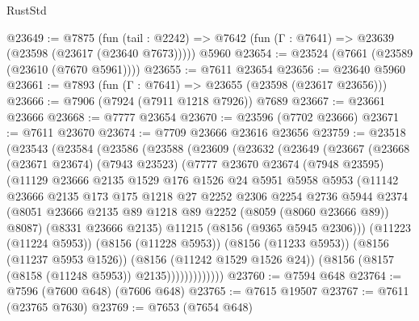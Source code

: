\begin{lexlean}{RustStd}
\begin{coremodule}
{\begin{coremodule}
{{{{{{{{{{{{{{{{{{{{{{{{{{{{{{{{{{@23649 := @7875
    (fun (tail : @2242) => @7642 (fun (Γ : @7641) => @23639 (@23598 (@23617 (@23640 @7673)))))
    @5960
@23654 := @23524 (@7661 (@23589 (@23610 (@7670 @5961))))
@23655 := @7611 @23654
@23656 := @23640 @5960
@23661 := @7893 (fun (Γ : @7641) => @23655 (@23598 (@23617 @23656)))
@23666 := @7906 (@7924 (@7911 @1218 @7926)) @7689
@23667 := @23661 @23666
@23668 := @7777 @23654
@23670 := @23596 (@7702 @23666)
@23671 := @7611 @23670
@23674 := @7709 @23666 @23616 @23656
@23759 := @23518
    (@23543
      (@23584
        (@23586
          (@23588
            (@23609
              (@23632
                (@23649
                  (@23667
                    (@23668
                      (@23671 @23674)
                      (@7943 @23523)
                      (@7777
                        @23670
                        @23674
                        (@7948 @23595)
                        (@11129
                          @23666
                          @2135
                          @1529
                          @176
                          @1526
                          @24
                          @5951
                          @5958
                          @5953
                          (@11142
                            @23666
                            @2135
                            @173
                            @175
                            @1218
                            @27
                            @2252
                            @2306
                            @2254
                            @2736
                            @5944
                            @2374
                            (@8051
                              @23666
                              @2135
                              @89
                              @1218
                              @89
                              @2252
                              (@8059 (@8060 @23666 @89))
                              @8087)
                            (@8331 @23666 @2135)
                            @11215
                            (@8156 (@9365 @5945 @2306)))
                          (@11223 (@11224 @5953))
                          (@8156 (@11228 @5953))
                          (@8156 (@11233 @5953))
                          (@8156 (@11237 @5953 @1526))
                          (@8156 (@11242 @1529 @1526 @24))
                          (@8156 (@8157 (@8158 (@11248 @5953)) @2135)))))))))))))
@23760 := @7594 @648
@23764 := @7596 (@7600 @648) (@7606 @648)
@23765 := @7615 @19507
@23767 := @7611 (@23765 @7630)
@23769 := @7653 (@7654 @648)
}}}}}}}}}}}}}}}}}}}}}}}}}}}}}}}}}}
\end{coremodule}}
\end{coremodule}
\end{lexlean}
